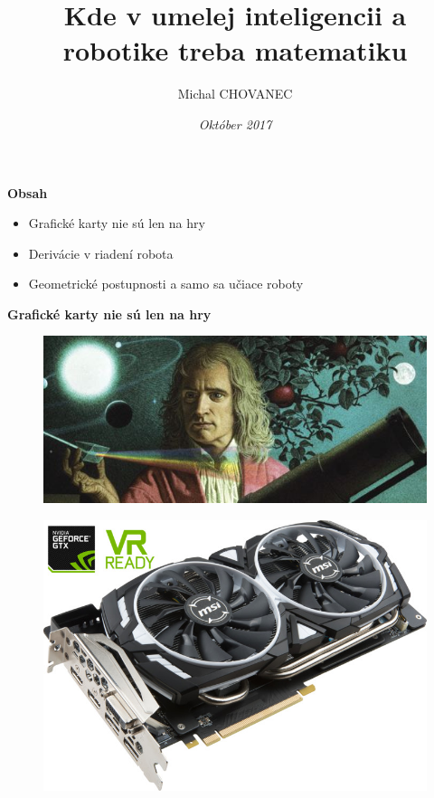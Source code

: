 \documentclass[xcolor=dvipsnames]{beamer}
\title{\bf Kde v umelej inteligencii a robotike treba matematiku}
\author{Michal CHOVANEC}
\date[EURP]{\it Október 2017}
\begin{document}
\begin{frame}
\titlepage
{}
\end{frame}



\begin{frame}{\bf Obsah}

    \begin{itemize}
      \item Grafické karty nie sú len na hry
      \item Derivácie v riadení robota
      \item Geometrické postupnosti a samo sa učiace roboty
    \end{itemize}


\end{frame}


\begin{frame}{\bf Grafické karty nie sú len na hry}

\centering
\begin{figure}[htbp]
  \centering
    \includegraphics[scale=0.5]{../pictures/newton.jpg}
\end{figure}

\begin{figure}[htbp]
  \centering
    \includegraphics[scale=1.0]{../pictures/1080ti.jpg}
\end{figure}

\end{frame}
\end{document}
